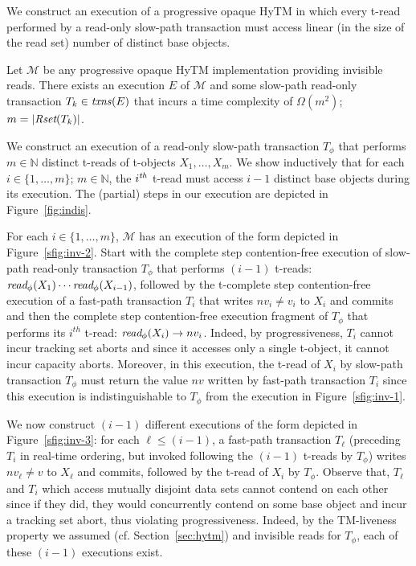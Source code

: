 We construct an execution of a progressive opaque HyTM in which every t-read performed by a read-only slow-path transaction
must access linear (in the size of the read set) number of distinct base objects.
%
\begin{theorem}
\label{th:impossibility}
Let $\mathcal{M}$ be any progressive opaque HyTM implementation providing invisible reads.
There exists an execution $E$ of $\mathcal{M}$ and some slow-path read-only transaction $T_k \in \ms{txns}(E)$
that incurs a time complexity of $\Omega (m^2)$; $m=|\textit{Rset}(T_k)|$.
\end{theorem}
%
\begin{proofsketch}
We construct an execution of a read-only slow-path transaction $T_{\phi}$ that performs $m \in \mathbb{N}$
distinct t-reads of t-objects $X_1,\ldots , X_m$. We show inductively that for each 
$i\in \{1,\ldots , m\}$; $m \in \mathbb{N}$, the $i^{\ms{th}}$ t-read must access $i-1$ distinct base objects
during its execution. The (partial) steps in our execution are depicted in Figure~\ref{fig:indis}.

For each $i\in \{1,\ldots , m\}$, $\mathcal{M}$ has an execution of the form depicted in Figure~\ref{sfig:inv-2}.
Start with the complete step contention-free execution of slow-path read-only transaction $T_{\phi}$ that performs
$(i-1)$ t-reads: $\textit{read}_{\phi}(X_1)\cdots \textit{read}_{\phi}(X_{i-1})$, followed by the t-complete step contention-free execution of a fast-path transaction $T_{i}$
that writes $nv_i\neq v_i$ to $X_i$ and commits and then the complete step contention-free execution fragment of $T_{\phi}$ that performs its $i^{th}$ t-read:
$\textit{read}_{\phi}(X_i) \rightarrow nv_i$. Indeed, by progressiveness, $T_i$ cannot incur tracking set aborts and since it accesses only a single t-object, it cannot incur capacity aborts.
Moreover, in this execution, the t-read of $X_i$ by slow-path transaction $T_{\phi}$ must return the value $nv$ written by fast-path transaction $T_i$ since this execution is indistinguishable
to $T_{\phi}$ from the execution in Figure~\ref{sfig:inv-1}. 

We now construct $(i-1)$ different executions of the form depicted in Figure~\ref{sfig:inv-3}: for each $\ell \leq (i-1)$, 
a fast-path transaction $T_{\ell}$ (preceding $T_i$ in real-time ordering, but invoked following the $(i-1)$ t-reads by $T_{\phi}$) writes $nv_{\ell}\neq v$ to $X_{\ell}$ and commits, followed by
the t-read of $X_i$ by $T_{\phi}$. Observe that, $T_{\ell}$ and $T_i$ which access mutually disjoint data sets cannot contend on each other since if they did, they would concurrently contend
on some base object and incur a tracking set abort, thus violating progressiveness.
Indeed, by the TM-liveness property we assumed (cf. Section~\ref{sec:hytm}) and invisible reads for $T_{\phi}$, each of these $(i-1)$ executions exist. 


\end{proofsketch}

